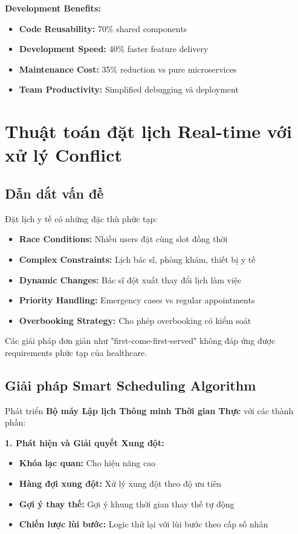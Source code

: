 \documentclass[../DoAn.tex]{subfiles}
\begin{document}
\textbf{Development Benefits:}
\begin{itemize}
    \item \textbf{Code Reusability:} 70\% shared components
    \item \textbf{Development Speed:} 40\% faster feature delivery
    \item \textbf{Maintenance Cost:} 35\% reduction vs pure microservices
    \item \textbf{Team Productivity:} Simplified debugging và deployment
\end{itemize}

\section{Thuật toán đặt lịch Real-time với xử lý Conflict}
\label{section:5.3}

\subsection{Dẫn dắt vấn đề}

Đặt lịch y tế có những đặc thù phức tạp:
\begin{itemize}
    \item \textbf{Race Conditions:} Nhiều users đặt cùng slot đồng thời
    \item \textbf{Complex Constraints:} Lịch bác sĩ, phòng khám, thiết bị y tế
    \item \textbf{Dynamic Changes:} Bác sĩ đột xuất thay đổi lịch làm việc
    \item \textbf{Priority Handling:} Emergency cases vs regular appointments
    \item \textbf{Overbooking Strategy:} Cho phép overbooking có kiểm soát
\end{itemize}

Các giải pháp đơn giản như "first-come-first-served" không đáp ứng được requirements phức tạp của healthcare.

\subsection{Giải pháp Smart Scheduling Algorithm}

Phát triển \textbf{Bộ máy Lập lịch Thông minh Thời gian Thực} với các thành phần:

\textbf{1. Phát hiện và Giải quyết Xung đột:}
\begin{itemize}
    \item \textbf{Khóa lạc quan:} Cho hiệu năng cao
    \item \textbf{Hàng đợi xung đột:} Xử lý xung đột theo độ ưu tiên
    \item \textbf{Gợi ý thay thế:} Gợi ý khung thời gian thay thế tự động
    \item \textbf{Chiến lược lùi bước:} Logic thử lại với lùi bước theo cấp số nhân
\end{itemize}
\end{document}
